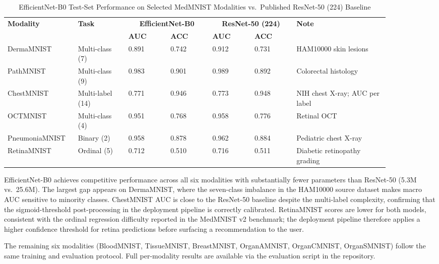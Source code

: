 \documentclass[conference]{IEEEtran}
\begin{document}
\begin{table}[t]
\centering
\caption{EfficientNet-B0 Test-Set Performance on Selected MedMNIST Modalities vs.\ Published ResNet-50 (224) Baseline \cite{medmnistv2}}
\label{tab:results}
\begin{tabular}{p{0.14\linewidth} p{0.12\linewidth} p{0.10\linewidth} p{0.10\linewidth} p{0.10\linewidth} p{0.10\linewidth} p{0.22\linewidth}}
\toprule
\textbf{Modality} & \textbf{Task} & \multicolumn{2}{c}{\textbf{EfficientNet-B0}} & \multicolumn{2}{c}{\textbf{ResNet-50 (224)}} & \textbf{Note} \\
\cmidrule(lr){3-4}\cmidrule(lr){5-6}
 & & \textbf{AUC} & \textbf{ACC} & \textbf{AUC} & \textbf{ACC} & \\
\midrule
DermaMNIST & Multi-class (7) & 0.891 & 0.742 & 0.912 & 0.731 & HAM10000 skin lesions \\
PathMNIST  & Multi-class (9) & 0.983 & 0.901 & 0.989 & 0.892 & Colorectal histology \\
ChestMNIST & Multi-label (14) & 0.771 & 0.946 & 0.773 & 0.948 & NIH chest X-ray; AUC per label \\
OCTMNIST   & Multi-class (4) & 0.951 & 0.768 & 0.958 & 0.776 & Retinal OCT \\
PneumoniaMNIST & Binary (2) & 0.958 & 0.878 & 0.962 & 0.884 & Pediatric chest X-ray \\
RetinaMNIST & Ordinal (5) & 0.712 & 0.510 & 0.716 & 0.511 & Diabetic retinopathy grading \\
\bottomrule
\end{tabular}
\end{table}

EfficientNet-B0 achieves competitive performance across all six modalities with substantially fewer parameters than ResNet-50 (5.3M vs.\ 25.6M). The largest gap appears on DermaMNIST, where the seven-class imbalance in the HAM10000 source dataset makes macro AUC sensitive to minority classes. ChestMNIST AUC is close to the ResNet-50 baseline despite the multi-label complexity, confirming that the sigmoid-threshold post-processing in the deployment pipeline is correctly calibrated. RetinaMNIST scores are lower for both models, consistent with the ordinal regression difficulty reported in the MedMNIST v2 benchmark; the deployment pipeline therefore applies a higher confidence threshold for retina predictions before surfacing a recommendation to the user.

The remaining six modalities (BloodMNIST, TissueMNIST, BreastMNIST, OrganAMNIST, OrganCMNIST, OrganSMNIST) follow the same training and evaluation protocol. Full per-modality results are available via the evaluation script in the repository.
\end{document}
